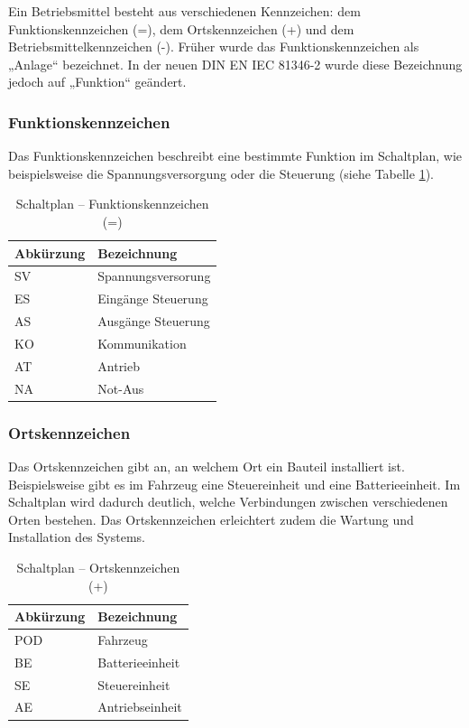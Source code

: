 Ein Betriebsmittel besteht aus verschiedenen Kennzeichen: dem Funktionskennzeichen (=), dem Ortskennzeichen (+) und dem Betriebsmittelkennzeichen (-). Früher wurde das Funktionskennzeichen als „Anlage“ bezeichnet. In der neuen DIN EN IEC 81346-2 \cite{DIN_EN_IEC_81346-2} wurde diese Bezeichnung jedoch auf „Funktion“ geändert.

\subsubsection{Funktionskennzeichen}
Das Funktionskennzeichen beschreibt eine bestimmte Funktion im Schaltplan, wie beispielsweise die Spannungsversorgung oder die Steuerung (siehe Tabelle \ref{BMK:tab:funktionskennzeichen}).

\pagebreak[1]
\begin{table}[!ht]
	\centering
	\caption{Schaltplan – Funktionskennzeichen (=)}
	\label{BMK:tab:funktionskennzeichen}
	\begin{tabular}{ll}
		\hline
		\textbf{Abkürzung}      & \textbf{Bezeichnung} \\ \hline
		\multicolumn{1}{l|}{SV} & Spannungsversorung   \\
		\multicolumn{1}{l|}{ES} & Eingänge Steuerung   \\
		\multicolumn{1}{l|}{AS} & Ausgänge Steuerung   \\
		\multicolumn{1}{l|}{KO} & Kommunikation        \\
		\multicolumn{1}{l|}{AT} & Antrieb              \\
		\multicolumn{1}{l|}{NA} & Not-Aus              \\ \hline
	\end{tabular}
\end{table}
\pagebreak[1]

\subsubsection{Ortskennzeichen}
Das Ortskennzeichen gibt an, an welchem Ort ein Bauteil installiert ist. Beispielsweise gibt es im Fahrzeug eine Steuereinheit und eine Batterieeinheit. Im Schaltplan wird dadurch deutlich, welche Verbindungen zwischen verschiedenen Orten bestehen. Das Ortskennzeichen erleichtert zudem die Wartung und Installation des Systems.

\pagebreak[1]
\begin{table}[!ht]
	\centering
	\caption{Schaltplan – Ortskennzeichen (+)}
	\label{bmk:tab:ortskennzeichen}
	\begin{tabular}{ll}
		\hline
		\textbf{Abkürzung}       & \textbf{Bezeichnung} \\ \hline
		\multicolumn{1}{l|}{POD} & Fahrzeug             \\
		\multicolumn{1}{l|}{BE}  & Batterieeinheit      \\
		\multicolumn{1}{l|}{SE}  & Steuereinheit        \\
		\multicolumn{1}{l|}{AE}  & Antriebseinheit      \\ \hline
	\end{tabular}
\end{table}
\pagebreak[1]

